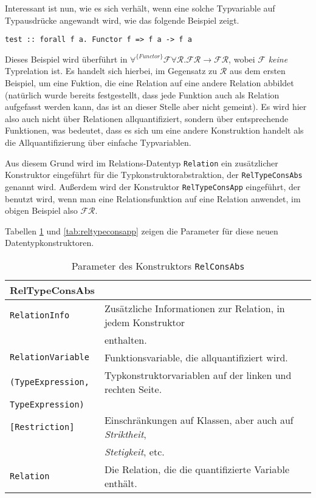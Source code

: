 Interessant ist nun, wie es sich verhält, wenn eine solche Typvariable auf Typausdrücke angewandt wird, wie das folgende
Beispiel zeigt.

\begin{verbatim}
test :: forall f a. Functor f => f a -> f a
\end{verbatim}

Dieses Beispiel wird überführt in $\forall^{\{Functor\}} \mathcal{F} \forall \mathcal{R}. \mathcal{F} \mathcal{R} \rightarrow
\mathcal{F} \mathcal{R}$, wobei $\mathcal{F}$ \textit{keine} Typrelation ist. Es handelt sich hierbei, im Gegensatz zu $\mathcal{R}$ aus
dem ersten Beispiel, um eine Fuktion, die eine Relation auf eine andere Relation abbildet (natürlich wurde bereits festgestellt,
dass jede Funktion auch als Relation aufgefasst werden kann, das ist an dieser Stelle aber nicht gemeint). Es wird hier also auch nicht über
Relationen allquantifiziert, sondern über entsprechende Funktionen, was bedeutet, dass es sich um eine andere Konstruktion
handelt als die Allquantifizierung über einfache Typvariablen.

Aus diesem Grund wird im Relations-Datentyp \texttt{Relation} ein zusätzlicher Konstruktor eingeführt für die Typkonstruktorabstraktion, der
\texttt{RelTypeConsAbs} genannt wird. Außerdem wird der Konstruktor \texttt{RelTypeConsApp} eingeführt, der benutzt
wird, wenn man eine Relationsfunktion auf eine Relation anwendet, im obigen Beispiel also $\mathcal{F} \mathcal{R}$.

Tabellen \ref{tab:reltypeconsabs} und \ref{tab:reltypeconsapp} zeigen die Parameter für diese neuen Datentypkonstruktoren.

\begin{table}[th]
\begin{tabular}{ | l | l | }
\hline
RelTypeConsAbs & \\
\hline
\texttt{RelationInfo} & Zusätzliche Informationen zur Relation, in jedem Konstruktor \\
& enthalten. \\
\texttt{RelationVariable} & Funktionsvariable, die allquantifiziert wird. \\
\texttt{(TypeExpression,} & Typkonstruktorvariablen auf der linken und rechten Seite. \\
\texttt{TypeExpression)} & \\
\texttt{[Restriction]} & Einschränkungen auf Klassen, aber auch auf \textit{Striktheit},\\
& \textit{Stetigkeit}, etc. \\
\texttt{Relation} & Die Relation, die die quantifizierte Variable enthält. \\
\hline
\end{tabular}
\caption{Parameter des Konstruktors \texttt{RelConsAbs}}
\label{tab:reltypeconsabs}
\end{table}

